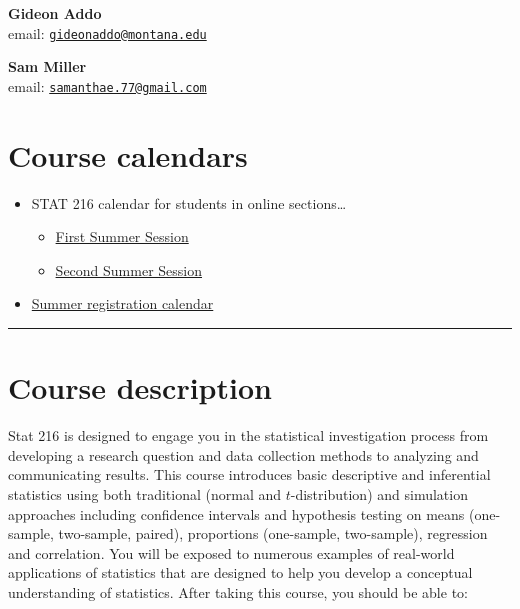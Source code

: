 \documentclass[
]{article}
\providecommand{\tightlist}{%
  \setlength{\itemsep}{0pt}\setlength{\parskip}{0pt}}
\begin{document}
\textbf{Gideon Addo}\\
email:
\href{mailto:gideonaddo@montana.edu}{\nolinkurl{gideonaddo@montana.edu}}

\textbf{Sam Miller}\\
email:
\href{mailto:samanthae.77@gmail.com}{\nolinkurl{samanthae.77@gmail.com}}

\section{Course calendars}\label{course-calendars}

\begin{itemize}
\tightlist
\item
  STAT 216 calendar for students in online sections\ldots{}

  \begin{itemize}
  \tightlist
  \item
    \href{calendars/Sum1_25-Stat216_Calendar-Online.pdf}{First Summer
    Session}
  \item
    \href{calendars/Sum2_25-Stat216_Calendar-Online.pdf}{Second Summer
    Session}
  \end{itemize}
\item
  \href{https://www.montana.edu/registrar/add_drop_schedule.html}{Summer
  registration calendar}
\end{itemize}

\begin{center}\rule{0.5\linewidth}{0.5pt}\end{center}

\section{Course description}\label{course-description}

Stat 216 is designed to engage you in the statistical investigation
process from developing a research question and data collection methods
to analyzing and communicating results. This course introduces basic
descriptive and inferential statistics using both traditional (normal
and \(t\)-distribution) and simulation approaches including confidence
intervals and hypothesis testing on means (one-sample, two-sample,
paired), proportions (one-sample, two-sample), regression and
correlation. You will be exposed to numerous examples of real-world
applications of statistics that are designed to help you develop a
conceptual understanding of statistics. After taking this course, you
should be able to:
\end{document}
